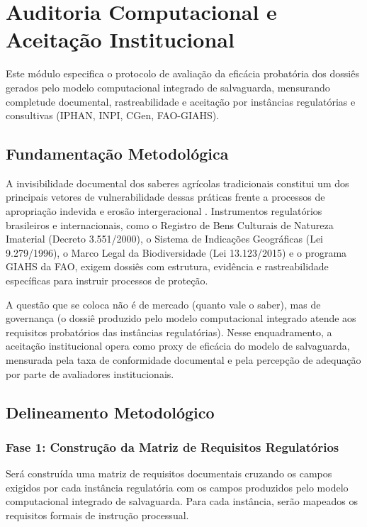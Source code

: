 \section{Auditoria Computacional e Aceitação Institucional}

Este módulo especifica o protocolo de avaliação da eficácia probatória dos dossiês gerados pelo modelo computacional integrado de salvaguarda, mensurando completude documental, rastreabilidade e aceitação por instâncias regulatórias e consultivas (IPHAN, INPI, CGen, FAO-GIAHS).

\subsection{Fundamentação Metodológica}

A invisibilidade documental dos saberes agrícolas tradicionais constitui um dos principais vetores de vulnerabilidade dessas práticas frente a processos de apropriação indevida e erosão intergeracional \cite{Santilli2009,Cunha2009}. Instrumentos regulatórios brasileiros e internacionais, como o Registro de Bens Culturais de Natureza Imaterial (Decreto 3.551/2000), o Sistema de Indicações Geográficas (Lei 9.279/1996), o Marco Legal da Biodiversidade (Lei 13.123/2015) e o programa GIAHS da FAO, exigem dossiês com estrutura, evidência e rastreabilidade específicas para instruir processos de proteção.

A questão que se coloca não é de mercado (quanto vale o saber), mas de governança (o dossiê produzido pelo modelo computacional integrado atende aos requisitos probatórios das instâncias regulatórias). Nesse enquadramento, a aceitação institucional opera como proxy de eficácia do modelo de salvaguarda, mensurada pela taxa de conformidade documental e pela percepção de adequação por parte de avaliadores institucionais.

\subsection{Delineamento Metodológico}

\subsubsection{Fase 1: Construção da Matriz de Requisitos Regulatórios}

Será construída uma matriz de requisitos documentais cruzando os campos exigidos por cada instância regulatória com os campos produzidos pelo modelo computacional integrado de salvaguarda. Para cada instância, serão mapeados os requisitos formais de instrução processual.

